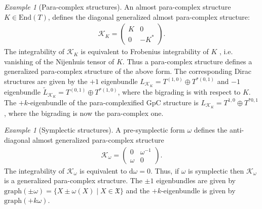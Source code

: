 \documentclass[letterpaper,12pt]{article}
\newcommand{\KK}{\mathcal{K}}
\newcommand{\XX}{\mathfrak{X}}
\newcommand{\id}{\mathbbm{1}}
\newcommand{\rd}{\mathrm{d}}
\newcommand{\Endo}{\text{End}}
\theoremstyle{definition}
\theoremstyle{remark}
\theoremstyle{examples}
\newtheorem{Ex}[theorem]{Example}
\begin{document}
\begin{Ex}[Para-complex structures]\label{ex: pc}
An almost para-complex structure $K\in \Endo(T)$, defines the diagonal generalized almost para-complex structure:
\begin{align*}
\KK_K=
\begin{pmatrix}
K & 0 \\
0 & -K^*
\end{pmatrix}.
\end{align*}
The integrability of $\KK_K$ is equivalent to Frobenius integrability of $K$ , i.e. vanishing of the Nijenhuis tensor of $K$.
Thus a para-complex structure defines a generalized para-complex structure of the above form. 
The corresponding Dirac structures are given by the $+1$ eigenbundle $L_{\KK_K}=T^{(1,0)}\oplus T^{*(0,1)}$ and $-1$ eigenbundle $\widetilde{L}_{\KK_K} =T^{(0,1)}\oplus T^{*(1,0)}$, where the bigrading is with respect to $K$. The $+k$-eigenbundle of the para-complexified GpC structure is $L_{\KK_K}=T^{1,0}\oplus T^{*0,1}$, where the bigrading is now the para-complex one.
%
\end{Ex}

\begin{Ex}[Symplectic structures]\label{ex:GpC_sympl}
A pre-symplectic form $\omega$ defines the anti-diagonal almost generalized para-complex structure
\begin{align*}
\KK_\omega=
\begin{pmatrix}
0 & \omega^{-1} \\
\omega & 0
\end{pmatrix}.
\end{align*}
The integrability of $\KK_\omega$ is equivalent to $\rd\omega=0$.
Thus, if $\omega$ is symplectic then $\KK_\omega$ is a generalized para-complex structure.
The $\pm 1$ eigenbundles are given by $\text{graph}(\pm\omega)=\{X\pm\omega(X)\mid X\in \XX\}$ and the $+k$-eigenbundle is given by $\text{graph}(+k\omega)$.
\end{Ex}
\end{document}
